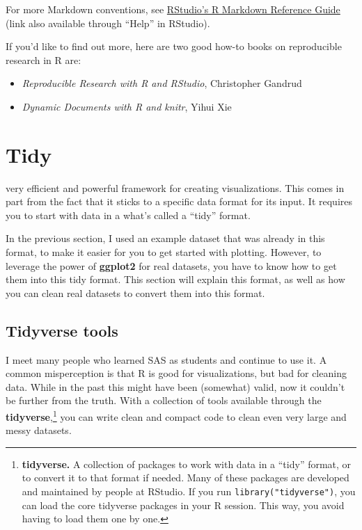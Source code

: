 \documentclass[]{tufte-book}
\providecommand{\tightlist}{%
  \setlength{\itemsep}{0pt}\setlength{\parskip}{0pt}}
\begin{document}
For more Markdown conventions, see \href{https://www.rstudio.com/wp-content/uploads/2015/03/rmarkdown-reference.pdf}{RStudio's R Markdown Reference Guide} (link also available through ``Help'' in RStudio).

If you'd like to find out more, here are two good how-to books on reproducible research in R are:

\begin{itemize}
\tightlist
\item
  \emph{Reproducible Research with R and RStudio}, Christopher Gandrud
\item
  \emph{Dynamic Documents with R and knitr}, Yihui Xie
\end{itemize}

\hypertarget{tidy}{%
\chapter{Tidy}\label{tidy}}

 very efficient and powerful
framework for
creating visualizations. This comes in part from the fact that it sticks
to a specific data format for its input. It requires you to start with
data in a what's called a ``tidy'' format.

In the previous section, I used an example dataset that was already in this
format, to make it easier for you to get started with plotting. However,
to leverage the power of \textbf{ggplot2} for real datasets, you have to know
how to get them into this tidy format. This section will explain this format,
as well as how you can clean real datasets to convert them into this format.

\hypertarget{tidyverse-tools}{%
\section{Tidyverse tools}\label{tidyverse-tools}}

 I meet many people who learned SAS as students
and continue
to use it. A common misperception is that R is good for visualizations, but bad for
cleaning data. While in the past this might have been (somewhat) valid, now it couldn't
be further from the truth. With a collection of tools available through the
\textbf{tidyverse},\footnote{\textbf{tidyverse.} A collection of packages to work with data in a
  ``tidy'' format, or to convert it to that format if needed. Many of these packages
  are developed and maintained by people at RStudio. If you run \texttt{library("tidyverse")},
  you can load the core tidyverse packages in your R session. This way, you avoid
  having to load them one by one.}
you can write clean and compact code to clean even very large and
messy datasets.
\end{document}
